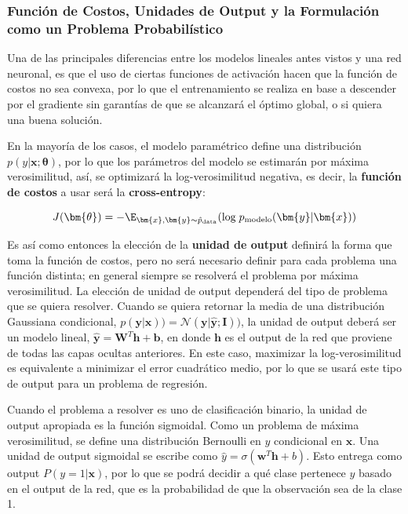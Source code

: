 \subsubsection{Funci\'on de Costos, Unidades de Output y la Formulaci\'on como un Problema Probabil\'istico}

Una de las principales diferencias entre los modelos lineales antes vistos y una red neuronal, es que el uso de ciertas funciones de activaci\'on hacen que la funci\'on de costos no sea convexa, por lo que el entrenamiento se realiza en base a descender por el gradiente sin garant\'ias de que se alcanzar\'a el \'optimo global, o si quiera una buena soluci\'on.

En la mayor\'ia de los casos, el modelo param\'etrico define una distribuci\'on $p(y|\bm{x}; \bm{\theta})$, por lo que los par\'ametros del modelo se estimar\'an por m\'axima verosimilitud, as\'i, se optimizar\'a la log-verosimilitud negativa, es decir, la \textbf{funci\'on de costos} a usar ser\'a la \textbf{cross-entropy}:

\begin{equation}
J(\bm{\theta}) = -\E_{\bm{x},\bm{y}\sim \hat{p}_{\textrm{data}}}(\textrm{log}\; p_{\textrm{modelo}}(\bm{y}|\bm{x}))
\end{equation}

Es as\'i como entonces la elecci\'on de la \textbf{unidad de output} definir\'a la forma que toma la funci\'on de costos, pero no ser\'a necesario definir para cada problema una funci\'on distinta; en general siempre se resolver\'a el problema por m\'axima verosimilitud. La elecci\'on de unidad de output depender\'a del tipo de problema que se quiera resolver. Cuando se quiera retornar la media de una distribuci\'on Gaussiana condicional, $p(\bm{y}|\bm{x})) = \mathcal{N}(\bm{y}|\hat{\bm{y}};\bm{I}))$, la unidad de output deber\'a ser un modelo lineal, $\hat{\bm{y}} = \bm{W}^{T}\bm{h} + \bm{b}$, en donde $\bm{h}$ es el output de la red que proviene de todas las capas ocultas anteriores. En este caso, maximizar la log-verosimilitud es equivalente a minimizar el error cuadr\'atico medio, por lo que se usar\'a este tipo de output para un problema de regresi\'on.

Cuando el problema a resolver es uno de clasificaci\'on binario, la unidad de output apropiada es la funci\'on sigmoidal. Como un problema de m\'axima verosimilitud, se define una distribuci\'on Bernoulli en $y$ condicional en $\bm{x}$. Una unidad de output sigmoidal se escribe como $\hat{{y}} = \sigma(\bm{w}^{T}\bm{h} + {b})$. Esto entrega como output $P(y=1|\bm{x})$, por lo que se podr\'a decidir a qu\'e clase pertenece $y$ basado en el output de la red, que es la probabilidad de que la observaci\'on sea de la clase 1.

